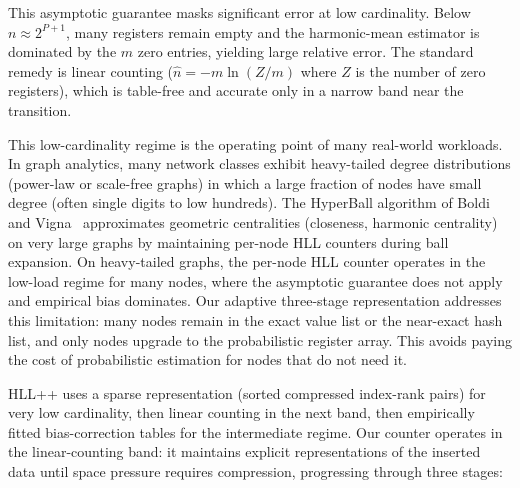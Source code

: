 \documentclass[11pt,letterpaper]{article}
\begin{document}
This asymptotic guarantee masks significant error at low
cardinality. Below $n \approx 2^{P+1}$, many registers remain empty and
the harmonic-mean estimator is dominated by the $m$ zero entries,
yielding large relative error. The standard remedy is linear counting
($\hat{n} = -m \ln(Z/m)$ where $Z$ is the number of zero registers),
which is table-free and accurate only in a narrow band near the
transition.

This low-cardinality regime is the operating point of many
real-world workloads. In graph analytics, many
network classes exhibit heavy-tailed degree distributions (power-law or
scale-free graphs) in which a large fraction of nodes have small
degree (often single digits to low hundreds). The HyperBall algorithm
of Boldi and Vigna~\cite{boldi2013hyperball} approximates geometric
centralities (closeness, harmonic centrality) on very large graphs by
maintaining per-node HLL counters during ball expansion. On
heavy-tailed graphs, the per-node HLL counter operates in the low-load
regime for many nodes, where the asymptotic guarantee does
not apply and empirical bias dominates. Our adaptive three-stage
representation addresses this limitation: many nodes remain in
the exact value list or the near-exact hash list, and only
nodes upgrade to the probabilistic register array. This avoids paying
the cost of probabilistic estimation for nodes that do not need it.

HLL++ uses a sparse representation (sorted compressed index-rank
pairs) for very low cardinality, then linear counting in the next
band, then empirically fitted bias-correction tables for the
intermediate regime. Our counter operates in the linear-counting band:
it maintains explicit representations of the inserted data until space
pressure requires compression, progressing through three stages:
\end{document}
